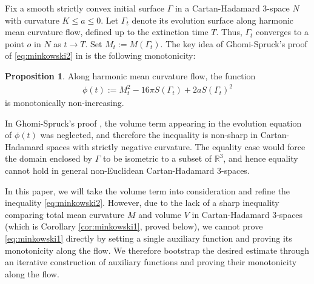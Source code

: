 \documentclass[11pt]{amsart}
\theoremstyle{definition}
\newcommand{\RR}{\mathbb{R}}
\newtheorem{prop}{Proposition}[section]
\theoremstyle{remark}
\numberwithin{equation}{section}
\begin{document}
	Fix a smooth strictly convex initial surface \(\Gamma\) in a Cartan-Hadamard 3-space $N$ with curvature $K\leq a\leq 0$. Let \(\Gamma_t\) denote its evolution surface along harmonic mean curvature flow, defined up to the extinction time \(T\). Thus, $\Gamma_t$ converges to a point $o$ in $N$ as $t\to T$. Set $M_t:=M(\Gamma_t)$. The key idea of Ghomi-Spruck's proof of \eqref{eq:minkowski2} in \cite{ghomi-spruck2023} is the following monotonicity:
	\begin{prop}
		Along harmonic mean curvature flow, the function
		\begin{align}\label{phi:ghomi-spruck}
			\phi(t) := M_t^2-16\pi S(\Gamma_t) +2a S(\Gamma_t)^2
		\end{align}
		is monotonically non-increasing.
	\end{prop}
	In Ghomi-Spruck's proof \cite{ghomi-spruck2023}, the volume term appearing in the evolution equation of $\phi(t)$ was neglected, and therefore the inequality is non-sharp in Cartan-Hadamard spaces with strictly negative curvature. The equality case would force the domain enclosed by $\Gamma$ to be isometric to a subset of $\RR^3$, and hence equality cannot hold in general non-Euclidean Cartan-Hadamard 3-spaces. 
	
	In this paper, we will take the volume term into consideration and refine the inequality \eqref{eq:minkowski2}. However, due to the lack of a sharp inequality comparing total mean curvature $M$ and volume $V$ in Cartan-Hadamard 3-spaces (which is Corollary \ref{cor:minkowski1}, proved below), we cannot prove \eqref{eq:minkowski1} directly by setting a single auxiliary function and proving its monotonicity along the flow. We therefore bootstrap the desired estimate through an iterative construction of auxiliary functions and proving their monotonicity along the flow. %
\end{document}
